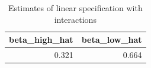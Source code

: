 \begin{table}[ht]
\centering
\begin{tabular}{rr}
  \hline
beta\_high\_hat & beta\_low\_hat \\ 
  \hline
0.321 & 0.664 \\ 
   \hline
\end{tabular}
\caption{Estimates of linear specification with interactions} 
\label{tab:int-syn-exp-beta}
\end{table}
